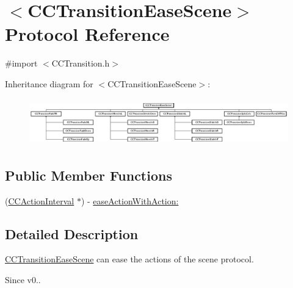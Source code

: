 \hypertarget{protocol_c_c_transition_ease_scene-p}{\section{$<$C\-C\-Transition\-Ease\-Scene$>$ Protocol Reference}
\label{protocol_c_c_transition_ease_scene-p}
}


{\ttfamily \#import $<$C\-C\-Transition.\-h$>$}

Inheritance diagram for $<$C\-C\-Transition\-Ease\-Scene$>$\-:\begin{figure}[H]
\begin{center}
\leavevmode
\includegraphics[height=2.046783cm]{protocol_c_c_transition_ease_scene-p}
\end{center}
\end{figure}
\subsection*{Public Member Functions}
\begin{DoxyCompactItemize}
\item 
(\hyperlink{class_c_c_action_interval}{C\-C\-Action\-Interval} $\ast$) -\/ \hyperlink{protocol_c_c_transition_ease_scene-p_a77b4a474b5e1d1760acb80a5c4f1b9c0}{ease\-Action\-With\-Action\-:}
\end{DoxyCompactItemize}


\subsection{Detailed Description}
\hyperlink{protocol_c_c_transition_ease_scene-p}{C\-C\-Transition\-Ease\-Scene} can ease the actions of the scene protocol. \begin{DoxySince}{Since}
v0.. 
\end{DoxySince}


